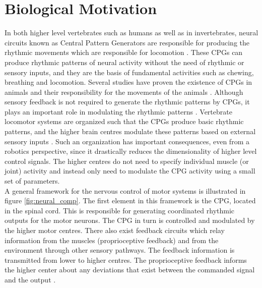 \documentclass[12pt,twoside]{article}
\theoremstyle{plain}
\theoremstyle{definition}
\theoremstyle{remark}
\newcommand{\forceindent}{\leavevmode{\parindent=2em\indent}}
\begin{document}
\section{Biological Motivation}
\label{sec:Biological_Motivation}
In both higher level vertebrates such as humans as well as in invertebrates, neural circuits known as Central Pattern Generators are responsible for producing the rhythmic movements which are responsible for locomotion \cite{Ijspeert2008}. These CPGs can produce rhythmic patterns of neural activity without the need of rhythmic or sensory inputs, and they are the basis of fundamental activities such as chewing, breathing and locomotion. Several studies have proven the existence of CPGs in animals and their responsibility for the movements of the animals \cite{cohen1980neuronal,grillner1985neural,stein1999neurons}. Although sensory feedback is not required to generate the rhythmic patterns by CPGs, it plays an important role in modulating the rhythmic patterns \cite{Ijspeert2008}. Vertebrate locomotor systems are organized such that the CPGs produce basic rhythmic patterns, and the higher brain centres modulate these patterns based on external sensory inputs \cite{Ijspeert2008}. Such an organization has important consequences, even from a robotics perspective, since it drastically reduces the dimensionality of higher level control signals. The higher centres do not need to specify individual muscle (or joint) activity and instead only need to modulate the CPG activity using a small set of parameters.\\
\forceindent A general framework for the nervous control of motor systems is illustrated in figure \ref{fig:neural_comp}. The first element in this framework is the CPG, located in the spinal cord. This is responsible for generating coordinated rhythmic outputs for the motor neurons. The CPG in turn is controlled and modulated by the higher motor centres. There also exist feedback circuits which relay information from the muscles (proprioceptive feedback) and from the environment through other sensory pathways. The feedback information is transmitted from lower to higher centres. The proprioceptive feedback informs the higher center about any deviations that exist between the commanded signal and the output \cite{neurobiology1994shepherd}.
\end{document}
